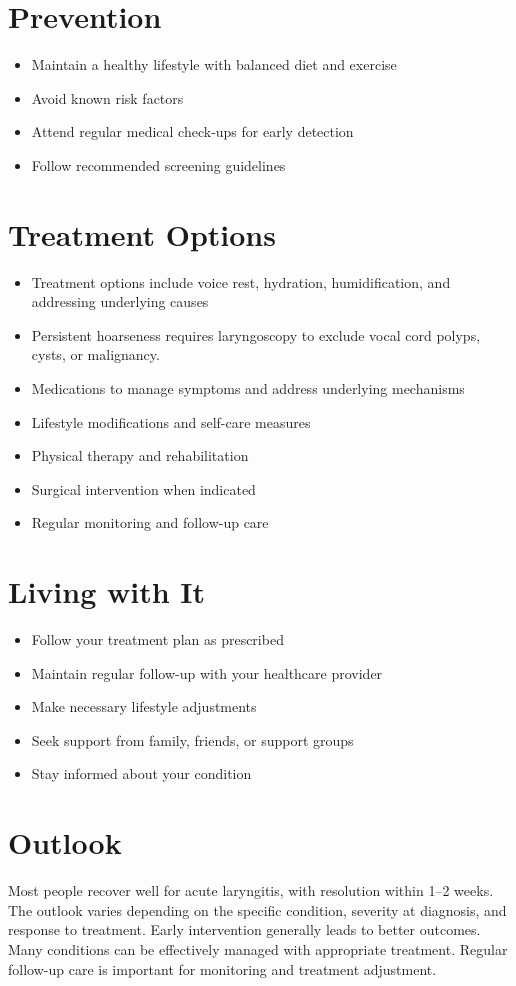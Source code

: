 \section{Prevention}
\begin{itemize}[noitemsep]
  \item Maintain a healthy lifestyle with balanced diet and exercise
  \item Avoid known risk factors
  \item Attend regular medical check-ups for early detection
  \item Follow recommended screening guidelines
\end{itemize}
\section{Treatment Options}
\begin{itemize}[noitemsep]
  \item Treatment options include voice rest, hydration, humidification, and addressing underlying causes
  \item Persistent hoarseness requires laryngoscopy to exclude vocal cord polyps, cysts, or malignancy.
  \item Medications to manage symptoms and address underlying mechanisms
  \item Lifestyle modifications and self-care measures
  \item Physical therapy and rehabilitation
  \item Surgical intervention when indicated
  \item Regular monitoring and follow-up care
\end{itemize}
\section{Living with It}
\begin{itemize}[noitemsep]
  \item Follow your treatment plan as prescribed
  \item Maintain regular follow-up with your healthcare provider
  \item Make necessary lifestyle adjustments
  \item Seek support from family, friends, or support groups
  \item Stay informed about your condition
\end{itemize}
\section{Outlook}
Most people recover well for acute laryngitis, with resolution within 1--2 weeks. The outlook varies depending on the specific condition, severity at diagnosis, and response to treatment. Early intervention generally leads to better outcomes. Many conditions can be effectively managed with appropriate treatment. Regular follow-up care is important for monitoring and treatment adjustment.
